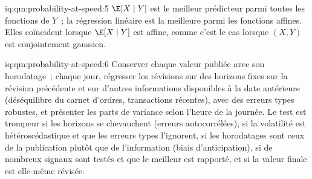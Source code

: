 \begin{solution}{iq:qm:probability-at-speed:5}
$\E[X \mid Y]$ est le meilleur prédicteur parmi toutes les fonctions de $Y$~; la régression linéaire est la
meilleure parmi les fonctions affines. Elles coïncident lorsque $\E[X \mid Y]$ est affine, comme c'est le cas lorsque $(X, Y)$ est
conjointement gaussien.
\end{solution}

\begin{solution}{iq:qm:probability-at-speed:6}
Conserver chaque valeur publiée avec son horodatage~; chaque jour, régresser les révisions sur des
horizons fixes sur la révision précédente et sur d'autres informations disponibles à la date antérieure
(déséquilibre du carnet d'ordres, transactions récentes), avec des erreurs types robustes, et présenter les parts de variance
selon l'heure de la journée. Le test est trompeur si les horizons se chevauchent (erreurs autocorrélées), si la
volatilité est hétéroscédastique et que les erreurs types l'ignorent, si les horodatages sont ceux
de la publication plutôt que de l'information (biais d'anticipation), si de nombreux signaux sont testés et que
le meilleur est rapporté, et si la valeur finale est elle-même révisée.
\end{solution}

